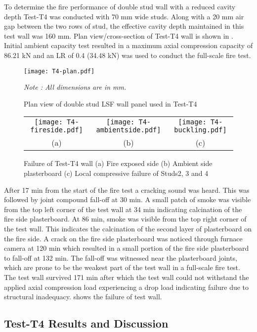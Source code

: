 To determine the fire performance of double stud wall with a reduced cavity depth Test-T4 was conducted with 70 mm wide studs. Along with a 20 mm air gap between the two rows of stud, the effective cavity depth maintained in this test wall was 160 mm. Plan view/cross-section of Test-T4 wall is shown in . Initial ambient capacity test resulted in a maximum axial compression capacity of 86.21 kN and an LR of 0.4 (34.48 kN) was used to conduct the full-scale fire test.      
\begin{figure}[!htbp]
	\centering
	\texttt{[image: T4-plan.pdf]}
	\caption{Plan view of double stud LSF wall panel used in Test-T4}
	\label{fig:T4-plan}
	\fontsize{10}{1}\textit{Note : All dimensions are in mm.}
\end{figure}
\begin{figure}[!htbp]
	\centering	
		\begin{tabular}{ccc}
			\texttt{[image: T4-fireside.pdf]} & 
			\texttt{[image: T4-ambientside.pdf]} & 
			\texttt{[image: T4-buckling.pdf]} \\
			(a) & (b) & (c) \\
			\end{tabular}
			\caption{Failure of Test-T4 wall (a) Fire exposed side (b) Ambient side plasterboard (c) Local compressive failure of Studs2, 3 and 4} 
		\label{fig:T4-failure}
\end{figure}

After 17 min from the start of the fire test a cracking sound was heard. This was followed by joint compound fall-off at 30 min. A small patch of smoke was visible from the top left corner of the test wall at 34 min indicating calcination of the fire side plasterboard. At 86 min, smoke was visible from the top right corner of the test wall. This indicates the calcination of the second layer of plasterboard on the fire side. A crack on the fire side plasterboard was noticed through furnace camera at 120 min which resulted in a small portion of the fire side plasterboard to fall-off at 132 min. The fall-off was witnessed near the plasterboard joints, which are prone to be the weakest part of the test wall in a full-scale fire test. The test wall survived 171 min after which the test wall could not withstand the applied axial compression load experiencing a drop load indicating failure due to structural inadequacy.  shows the failure of test wall.

\subsection{Test-T4 Results and Discussion}

